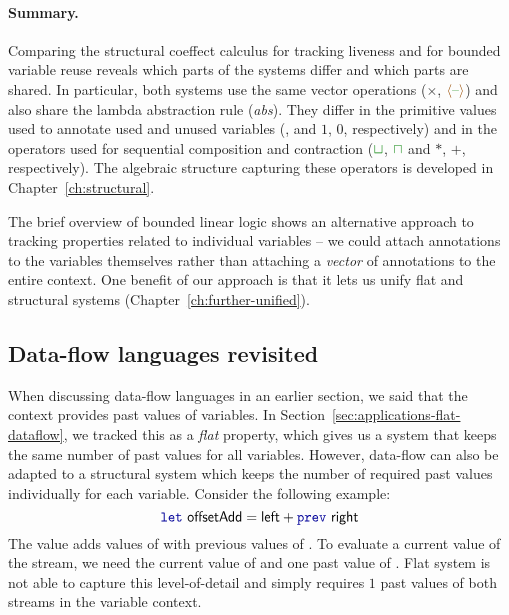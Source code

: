 \paragraph{Summary.}
Comparing the structural coeffect calculus for tracking liveness and for bounded variable reuse
reveals which parts of the systems differ and which parts are shared. In particular, both systems
use the same vector operations ($\times$, $\alift{\cclrd{\textnormal{--}}}$) and also share the
lambda abstraction rule (\emph{abs}). They differ in the primitive values used to annotate used
and unused variables (,  and $1$, $0$, respectively) and in the operators used
for sequential composition and contraction ($\cclrd{\sqcup}$, $\cclrd{\sqcap}$ and $\ast$, $+$, respectively).
The algebraic structure capturing these operators is developed in Chapter~\ref{ch:structural}.

The brief overview of bounded linear logic shows an alternative approach to tracking properties
related to individual variables -- we could attach annotations to the variables themselves
rather than attaching a \emph{vector} of annotations to the entire context. One benefit
of our approach is that it lets us unify flat and structural systems (Chapter~\ref{ch:further-unified}).


\subsection{Data-flow languages revisited}
\label{sec:applications-structural-dataflow}

When discussing data-flow languages in an earlier section, we said that the context provides
past values of variables. In Section~\ref{sec:applications-flat-dataflow}, we tracked this as
a \emph{flat} property, which gives us a system that keeps the same number of past values for
all variables. However, data-flow can also be adapted to a structural system which keeps the number
of required past values individually for each variable. Consider the
following example:
%
\begin{equation*}
\kvd{let}~\ident{offsetAdd} = \ident{left} + \kvd{prev}~\ident{right}
\end{equation*}
%
The value  adds values of  with previous values of .
To evaluate a current value of the stream, we need the current value of  and one past
value of . Flat system is not able to capture this level-of-detail and simply
requires $1$ past values of both streams in the variable context.

